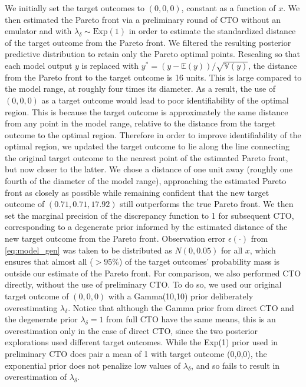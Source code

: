 \documentclass[12pt]{article}
\begin{document}
We initially set the target outcomes to $(0,0,0)$, constant as a function of $x$. 
%
We then estimated the Pareto front via a preliminary round of CTO without an emulator and with $\lambda_\delta\sim \mathrm{Exp}(1)$ in order to estimate the standardized distance of the target outcome from the Pareto front.
%
We filtered the resulting posterior predictive distribution to retain only the Pareto optimal points.
%
Rescaling so that each model output $y$ is replaced with $y^*=(y-\mathbb E(y))/\sqrt{\mathbb V(y)}$, the distance from the Pareto front to the target outcome is 16 units.
%
This is large compared to the model range, at roughly four times its diameter.
%
As a result, the use of $(0,0,0)$ as a target outcome would lead to poor identifiability of the optimal region. 
%
This is because the target outcome is approximately the same distance from any point in the model range, relative to the distance from the target outcome to the optimal region.
%
Therefore in order to improve identifiability of the optimal region, we updated the target outcome to lie along the line connecting the original target outcome to the nearest point of the estimated Pareto front, but now closer to the latter.
%
We chose a distance of one unit away (roughly one fourth of the diameter of the model range), approaching the estimated Pareto front as closely as possible while remaining confident that the new target outcome of $(0.71, 0.71, 17.92)$ still outperforms the true Pareto front.
%
We then set the marginal precision of the discrepancy function to 1 for subsequent CTO, corresponding to a degenerate prior informed by the estimated distance of the new target outcome from the Pareto front.
%
Observation error $\epsilon(\cdot)$ from \eqref{eq:model_gen} was taken to be distributed as $N(0,0.05)$ for all $x$, which ensures that almost all ($>95\%$) of the target outcomes' probability mass is outside our estimate of the Pareto front.
%
For comparison, we also performed CTO directly, without the use of preliminary CTO.
%
To do so, we used our original target outcome of $(0,0,0)$ with a Gamma(10,10) prior deliberately overestimating $\lambda_\delta$.
%
Notice that although the Gamma prior from direct CTO and the degenerate prior $\lambda_\delta=1$ from full CTO have the same means, this is an overestimation only in the case of direct CTO, since the two posterior explorations used different target outcomes.
%
While the Exp(1) prior used in preliminary CTO does pair a mean of 1 with target outcome (0,0,0), the exponential prior does not penalize low values of $\lambda_\delta$, and so fails to result in overestimation of $\lambda_\delta$.
\end{document}
